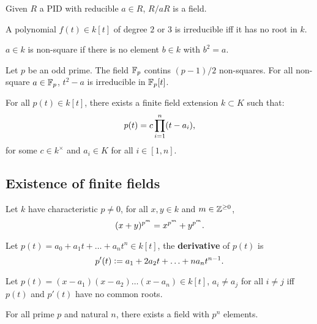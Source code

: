 \documentclass[../Year2.tex]{subfiles}
\begin{document}
\begin{corollary}
    Given $R$ a PID with reducible $a\in R$, $R/aR$ is a field.
\end{corollary}

\begin{theorem}
    A polynomial $f(t)\in k[t]$ of degree $2$ or $3$ is irreducible iff it has no root in $k$.
\end{theorem}

\begin{definition}
    $a\in k$ is non-square if there is no element $b\in k$ with $b^2=a$.
\end{definition}

\begin{lemma}
    Let $p$ be an odd prime. The field $\mathbb{F}_p$ contins $(p-1)/2$ non-squares. For all non-square $a\in\mathbb{F}_p$, $t^2-a$ is irreducible in $\mathbb{F}_p[t]$.
\end{lemma}

\begin{theorem}
    For all $p(t)\in k[t]$, there exists a finite field extension $k\subset K$ such that: \[
        p(t)=c\prod_{i=1}^n(t-a_i)
        \text{\textcolor{black}{,}}
    \] for some $c\in k^\times$ and $a_i\in K$ for all $i\in[1,n]$.
\end{theorem}

\subsection{Existence of finite fields}

\begin{theorem}
    Let $k$ have characteristic $p\neq 0$, for all $x,y\in k$ and $m\in\mathbb{Z}^{\geq 0}$, \[
        (x+y)^{p^m}=x^{p^m}+y^{p^m}
        \text{\textcolor{black}{.}}
    \]
\end{theorem}

\vspace{-30pt}

\begin{definition}[Derivative]
    Let $p(t)= a_0 + a_1t + \ldots + a_nt^n\in k[t]$, the \textbf{derivative} of $p(t)$ is \[
        p'(t):= a_1 + 2a_2t + \ldots + na_nt^{n-1}
        \text{\textcolor{black}{.}}
    \]
\end{definition}

\begin{lemma}
    Let $p(t)=(x-a_1)(x-a_2)\ldots(x-a_n)\in k[t]$, $a_i\neq a_j$ for all $i\neq j$ iff $p(t)$ and $p'(t)$ have no common roots.
\end{lemma}

\begin{theorem}
    For all prime $p$ and natural $n$, there exists a field with $p^n$ elements.
\end{theorem}
\end{document}
